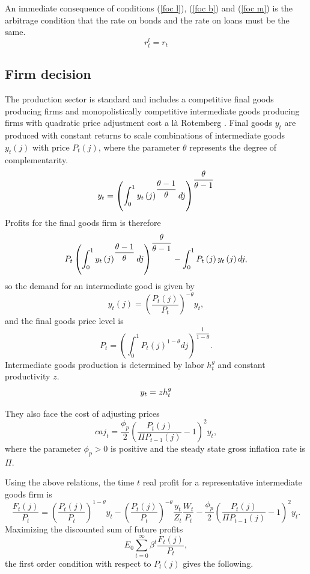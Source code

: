 \documentclass[]{article}
\begin{document}
An immediate consequence of conditions (\ref{foc l}), (\ref{foc b}) and (\ref{foc m}) is the arbitrage condition that the rate on bonds and the rate on loans must be the same.
\begin{equation}
r^{l}_{t}=r_{t} \label{arb r}
\end{equation}

\subsection{Firm decision}

The production sector is standard and includes a competitive final goods
producing firms and monopolistically competitive intermediate goods
producing firms with quadratic price adjustment cost a l\`a  Rotemberg \cite{rotemberg1982stickyprices}.
Final goods $y_{t}$ are produced with constant returns to scale combinations
of intermediate goods $y_{t}\left( j\right) $ with price $P_{t}\left(
j\right) $, where the parameter $\theta $ represents the degree of
complementarity.%
\[
y_{t}=\left(\int\nolimits_{0}^{1}y_{t}\left( j\right)^{\dfrac{\theta-1}{%
\theta}}dj\right)^{\dfrac{\theta}{\theta-1}} 
\]%
Profits for the final goods firm is therefore%
\[
P_{t}\left( \int\nolimits_{0}^{1}y_{t}\left( j\right) ^{\dfrac{\theta -1}{%
\theta }}dj\right) ^{\dfrac{\theta }{\theta -1}}-\int\nolimits_{0}^{1}P_{t}%
\left( j\right) y_{t}\left( j\right) dj, 
\]%
so the demand for an intermediate good is given by%
\[
y_{t}\left( j\right) =\left( \frac{P_{t}\left( j\right) }{P_{t}}\right)
^{-\theta }y_{t}, 
\]%
and the final goods price level is
\[
P_{t}=\left( \int\nolimits_{0}^{1}P_{t}\left( j\right) ^{1-\theta
}dj\right) ^{\dfrac{1}{1-\theta }}.
\]
Intermediate goods production is determined by labor $h_{t}^{g}$ and constant productivity $z$.
\begin{equation}
y_{t}=zh_{t}^{g} \label{prod} \\
\end{equation}%

They also face the cost of adjusting prices%
\[
caj_{t}=\frac{\phi _{p}}{2}\left( \frac{P_{t}\left( j\right) }{\Pi
P_{t-1}\left( j\right) }-1\right) ^{2} y_{t}, 
\]%
where the parameter $\phi _{p}>0$ is positive and the steady state gross inflation
rate is $\Pi $.

Using the above relations, the time $t$ real profit for a representative
intermediate goods firm is%
\[
\frac{F_{t}\left( j\right) }{P_{t}}=\left( \frac{P_{t}\left( j\right) }{P_{t}%
}\right) ^{1-\theta }y_{t}-\left( \frac{P_{t}\left( j\right) }{P_{t}}\right)
^{-\theta }\frac{y_{t}}{Z_{t}}\frac{W_{t}}{P_{t}}-\frac{\phi _{p}}{2}\left( 
\frac{P_{t}\left( j\right) }{\Pi P_{t-1}\left( j\right) }%
-1\right) ^{2}y_{t}.
\]%
Maximizing the discounted sum of future profits%
\[
E_{0}\sum\limits_{t=0}^{\infty }\beta ^{t}\frac{F_{t}\left( j\right) }{P_{t}%
},
\]%
the first order condition with respect to $P_{t}\left( j\right) $ gives the
following.%
\end{document}

